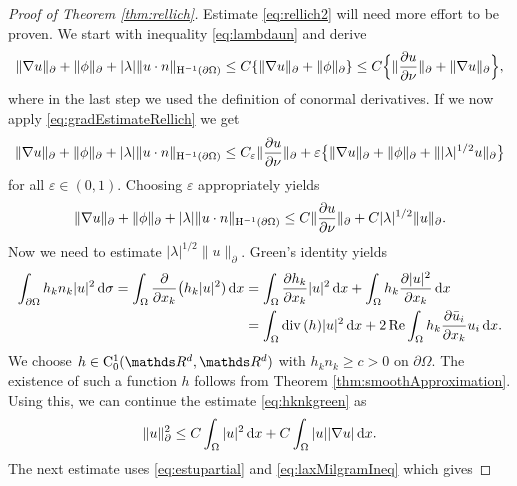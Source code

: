 \begin{proof}[Proof of Theorem \ref{thm:rellich}]
  Estimate \eqref{eq:rellich2} will need more effort to be proven.
  We start with inequality \eqref{eq:lambdaun} and derive
  \begin{align*}
    \|\nabla u\|_\partial + \|\phi\|_\partial + |\lambda| \|u \cdot n\|_{\mathrm{H}^{-1}(\partial\Omega)}
    \leq C \{ \|\nabla u\|_\partial + \| \phi\|_\partial \}
    \leq C \Big\{ \|\frac{\partial u}{\partial \nu} \|_\partial + \|\nabla u\|_\partial \Big\},
  \end{align*}
  where in the last step we used the definition of conormal derivatives.
  If we now apply \eqref{eq:gradEstimateRellich} we get
  \begin{align*}
    \|\nabla u\|_\partial + \|\phi\|_\partial + |\lambda| \|u \cdot n\|_{\mathrm{H}^{-1}(\partial\Omega)}
    \leq C_\varepsilon \| \frac{\partial u}{\partial \nu} \|_\partial + \varepsilon \big\{ \|\nabla u\|_\partial + \|\phi\|_\partial + \| |\lambda|^{1/2} u \|_\partial \big\}
  \end{align*}
  for all $\varepsilon \in (0,1)$.
  Choosing $\varepsilon$ appropriately yields
  \begin{align}
    \label{eq:partOfRellich2}
    \|\nabla u\|_\partial + \|\phi\|_\partial + |\lambda| \|u \cdot n\|_{\mathrm{H}^{-1}(\partial\Omega)}
    \leq C \|\frac{\partial u}{\partial \nu} \|_\partial + C |\lambda|^{1/2} \| u\|_\partial.
  \end{align}
  Now we need to estimate $|\lambda|^{1/2} \|u\|_\partial$.
  Green's identity yields
  \begin{align}
    \int_{\partial\Omega} h_k n_k |u|^2 \, {\operatorname{d}\!{\sigma}}
    = \int_{\Omega} \frac{\partial}{\partial x_k} \big( h_k |u|^2 ) \, {\operatorname{d}\!{x}}
    &= \int_{\Omega} \frac{\partial h_k}{\partial x_k} |u|^2 \, {\operatorname{d}\!{x}} + \int_{\Omega} h_k \frac{\partial |u|^2}{\partial x_k}  \, {\operatorname{d}\!{x}} \nonumber\\
    \label{eq:hknkgreen}
    &= \int_\Omega \mathrm{div\,} (h) |u|^2 \, {\operatorname{d}\!{x}} + 2 \operatorname{Re} \int_\Omega h_k \frac{\partial \bar u_i}{\partial x_k} u_i \, {\operatorname{d}\!{x}}.
  \end{align}
  We choose $h \in \CC_0^1(\R^d, \R^d)$ with $h_k n_k \geq c > 0$ on $\partial\Omega$. 
  The existence of such a function $h$ follows from Theorem \ref{thm:smoothApproximation}.
  Using this, we can continue the estimate \eqref{eq:hknkgreen} as
  \begin{align}
    \label{eq:estupartial}
    \|u\|_\partial^2 \leq C \int_\Omega |u|^2 \, {\operatorname{d}\!{x}} + C \int_\Omega |u| |\nabla u| \, {\operatorname{d}\!{x}}.
  \end{align}
  The next estimate uses \eqref{eq:estupartial} and \eqref{eq:laxMilgramIneq} which gives

\end{proof}
